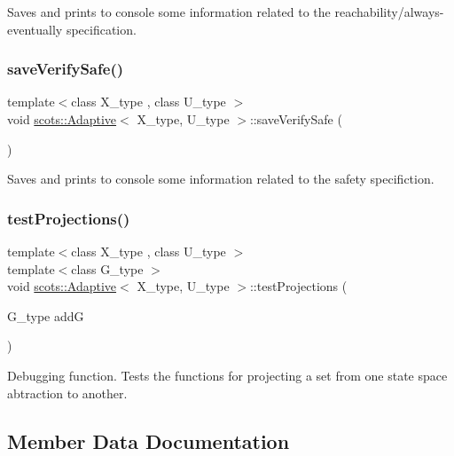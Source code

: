 Saves and prints to console some information related to the reachability/always-\/eventually specification. \mbox{\label{classscots_1_1Adaptive_a629133566055e6445983b86082838b96}} 
\subsubsection{\texorpdfstring{save\+Verify\+Safe()}{saveVerifySafe()}}
{\footnotesize\ttfamily template$<$class X\+\_\+type , class U\+\_\+type $>$ \\
void \hyperlink{classscots_1_1Adaptive}{scots\+::\+Adaptive}$<$ X\+\_\+type, U\+\_\+type $>$\+::save\+Verify\+Safe (\begin{DoxyParamCaption}{ }\end{DoxyParamCaption})\hspace{0.3cm}{\ttfamily [inline]}}

Saves and prints to console some information related to the safety specifiction. \mbox{\label{classscots_1_1Adaptive_aa4f1995704cf927fff530e715a6214ec}} 
\subsubsection{\texorpdfstring{test\+Projections()}{testProjections()}}
{\footnotesize\ttfamily template$<$class X\+\_\+type , class U\+\_\+type $>$ \\
template$<$class G\+\_\+type $>$ \\
void \hyperlink{classscots_1_1Adaptive}{scots\+::\+Adaptive}$<$ X\+\_\+type, U\+\_\+type $>$\+::test\+Projections (\begin{DoxyParamCaption}\item[{G\+\_\+type}]{addG }\end{DoxyParamCaption})\hspace{0.3cm}{\ttfamily [inline]}}

Debugging function. Tests the functions for projecting a set from one state space abtraction to another. 

\subsection{Member Data Documentation}
\mbox{\label{classscots_1_1Adaptive_ab51fe5639ecc8fd046c1d2d56fb25890}} 
